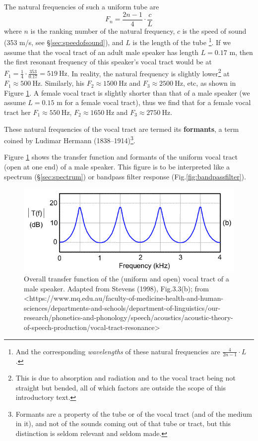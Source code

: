 \documentclass[
]{book}
\begin{document}
The natural frequencies of such a uniform tube are
\[F_n = \frac{2n-1}{4} \cdot \frac{c}{L}\]
where \(n\) is the ranking number of the natural frequency, \(c\) is the speed of sound (353 m/s, see §\ref{sec:speedofsound}), and \(L\) is the length of the tube \citep[139]{Stevens_1998} \footnote{And the corresponding \emph{wavelengths} of these natural frequencies are \(\frac{4}{2n-1}\cdot L\) \citep[60]{Nooteboom_Cohen_1984}.}.
If we assume that the vocal tract of an adult male speaker has length \(L=0.17\) m, then the first resonant frequency of this speaker's vocal tract would be at \(F_1 = \frac{1}{4} \cdot \frac{353}{0.17} = 519\ \textrm{Hz}\). In reality, the natural frequency is slightly lower\footnote{This is due to absorption and radiation and to the vocal tract being not straight but bended, all of which factors are outside the scope of this introductory text.} at \(F_1 \approx 500\ \textrm{Hz}\).
Similarly, his \(F_2 \approx 1500\ \textrm{Hz}\) and \(F_3 \approx 2500\ \textrm{Hz}\), etc, as shown in Figure \ref{fig:uniform-vt-transfer}.
A female vocal tract is slightly shorter than that of a male speaker (we assume \(L=0.15\) m for a female vocal tract), thus we find that for a female vocal tract her \(F_1 \approx 550\ \textrm{Hz}\), \(F_2 \approx 1650\ \textrm{Hz}\) and \(F_3 \approx 2750\ \textrm{Hz}\).

These natural frequencies of the vocal tract are termed its \textbf{formants}, a term coined by Ludimar Hermann (1838--1914)\footnote{Formants are a property of the tube or of the vocal tract (and of the medium in it), and not of the sounds coming out of that tube or tract, but this distinction is seldom relevant and seldom made.}.

Figure \ref{fig:uniform-vt-transfer} shows the transfer function and formants of the uniform vocal tract (open at one end) of a male speaker. This figure is to be interpreted like a spectrum (§\ref{sec:spectrum}) or bandpass filter response (Fig.\ref{fig:bandpassfilter}).

\begin{figure}

{\centering \includegraphics{figures/formants_stevens01_b} 

}

\caption{Overall transfer function of the (uniform and open) vocal tract of a male speaker. Adapted from Stevens (1998), Fig.3.3(b); from <https://www.mq.edu.au/faculty-of-medicine-health-and-human-sciences/departments-and-schools/department-of-linguistics/our-research/phonetics-and-phonology/speech/acoustics/acoustic-theory-of-speech-production/vocal-tract-resonance>}\label{fig:uniform-vt-transfer}
\end{figure}
\end{document}
